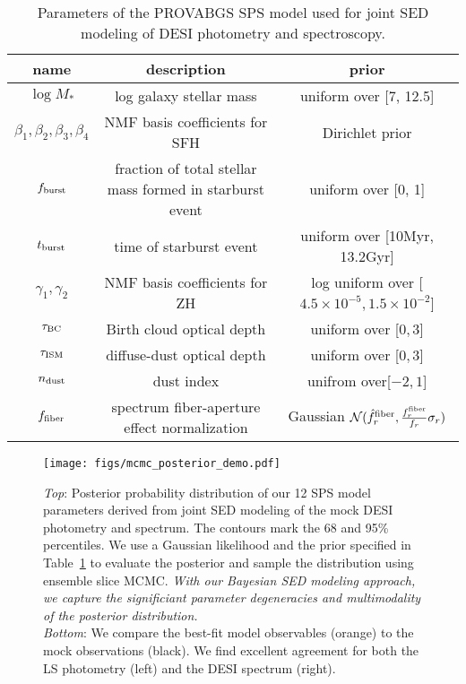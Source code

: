 \begin{table} 
\caption{Parameters of the PROVABGS SPS model used for joint SED modeling of
    DESI photometry and spectroscopy.} 
\begin{center}
    \begin{tabular}{ccc} \toprule
        name & description & prior \\[3pt]
        \hline 
        $\log M_*$                              & log galaxy stellar mass & uniform over [7, 12.5] \\
        $\beta_1, \beta_2, \beta_3, \beta_4$    & NMF basis coefficients for SFH & Dirichlet prior \\
        $f_{\rm burst}$ & fraction of total stellar mass formed in starburst event & uniform over [0, 1] \\
        $t_{\rm burst}$ & time of starburst event & uniform over [10Myr, 13.2Gyr] \\
        $\gamma_1, \gamma_2$ & NMF basis coefficients for ZH & log uniform over
        [$4.5\times10^{-5}, 1.5\times10^{-2}$] \\
        $\tau_{\rm BC}$ & Birth cloud optical depth & uniform over [$0, 3$] \\
        $\tau_{\rm ISM}$ & diffuse-dust optical depth & uniform over [$0, 3$] \\
        $n_{\rm dust}$ & \cite{calzetti2001} dust index & unifrom over[$-2, 1$]\\
        $f_{\rm fiber}$ & spectrum fiber-aperture effect normalization &
        Gaussian $\mathcal{N}(\hat{f}^{\rm fiber}_r, \frac{f^{\rm fiber}_r}{f_r} \sigma_r)$\\
        \hline            
\end{tabular} \label{tab:params}
\end{center}
\end{table}

\begin{figure}
\begin{center}
    \texttt{[image: figs/mcmc\_posterior\_demo.pdf]}
    \caption{
        \emph{Top}: 
        Posterior probability distribution of our 12 SPS model parameters
        derived from joint SED modeling of the mock DESI photometry and
        spectrum.
        The contours mark the 68 and 95\% percentiles.
        We use a Gaussian likelihood and the prior specified in
        Table~\ref{tab:params} to evaluate the posterior and sample the
        distribution using ensemble slice MCMC. 
        \emph{With our Bayesian SED modeling approach, we capture the significiant
        parameter degeneracies and multimodality of the posterior
        distribution.}\\
        \emph{Bottom}: 
        We compare the best-fit model observables (orange) to the mock
        observations (black).  
        We find excellent agreement for both the LS photometry (left) and the
        DESI spectrum (right). 
    } \label{fig:posterior}
\end{center}
\end{figure}


